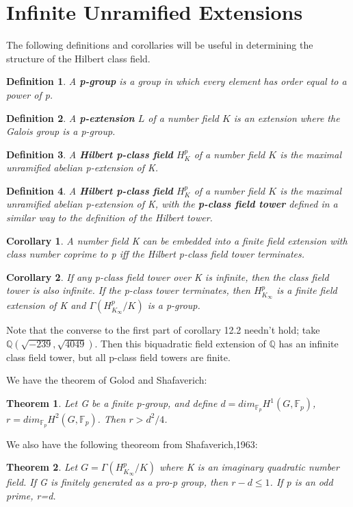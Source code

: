 \documentclass[preprint,12pt,reqno]{elsarticle}
\newtheorem{theorem}{Theorem}
\newtheorem{corollary}{Corollary}[theorem]
\newtheorem{definition}{Definition}
\begin{document}
\section{Infinite Unramified Extensions}
The following definitions and corollaries will be useful in determining the structure of the Hilbert class field. 
\begin{definition}
A \textbf{p-group} is a group in which every element has order equal to a power of p.
\end{definition}
\begin{definition}
A \textbf{p-extension} $L$ of a number field $K$ is an extension where the Galois group is a p-group.
\end{definition}
\begin{definition}
A \textbf{Hilbert p-class field} $H_K^{p}$ of a number field $K$ is the maximal unramified abelian p-extension of K.
\end{definition}
\begin{definition}
A \textbf{Hilbert p-class field} $H_K^{p}$ of a number field $K$ is the maximal unramified abelian p-extension of K, with the \textbf{p-class field tower} defined in a similar way to the definition of the Hilbert tower. 
\end{definition}
\begin{corollary}
 A number field K can be embedded into a finite field extension with class number coprime to p iff the Hilbert p-class field tower terminates.
\end{corollary}
\begin{corollary}
If any p-class field tower over K is infinite, then the class field tower is also infinite. If the p-class tower terminates, then $H_{K_\infty}^{p}$ is a finite field extension of K and $\Gamma(H_{K_\infty}^{p}/K)$ is a p-group.
\end{corollary}
Note that the converse to the first part of corollary 12.2 needn't hold; take $\mathbb{Q}(\sqrt{-239},\sqrt{4049})$. Then this biquadratic field extension of $\mathbb{Q}$ has an infinite class field tower, but all p-class field towers are finite. 
\par
We have the theorem of Golod and Shafaverich:\begin{theorem}
    Let G be a finite p-group, and define $d=dim_{\mathbb{F}_{p}}H^1(G,\mathbb{F}_p)$, $r=dim_{\mathbb{F}_{p}}H^2(G,\mathbb{F}_p)$. 
    Then $r>d^2/4$.
\end{theorem}
We also have the following theoreom from Shafaverich,1963:\begin{theorem}
    Let $G = \Gamma(H_{K_{\infty}}^{p}/K)$ where K is an imaginary quadratic number field. If G is finitely generated as a pro-p group, then
$r-d\leq 1 $. If p is an odd prime, r=d.
\end{theorem}
\end{document}
